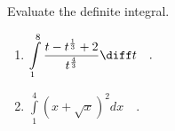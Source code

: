 Evaluate the definite integral.
\begin{enumerate}
\item $\displaystyle\int\limits_{1}^{8} \frac{t-t^{\frac{1}{3}}+ 2}{ t^{\frac{4}{3}}} \diff t\quad .$
\item $\displaystyle\int\limits_{1}^{4} \left(x+\sqrt{x}\right)^2 dx\quad .$
\end{enumerate}
